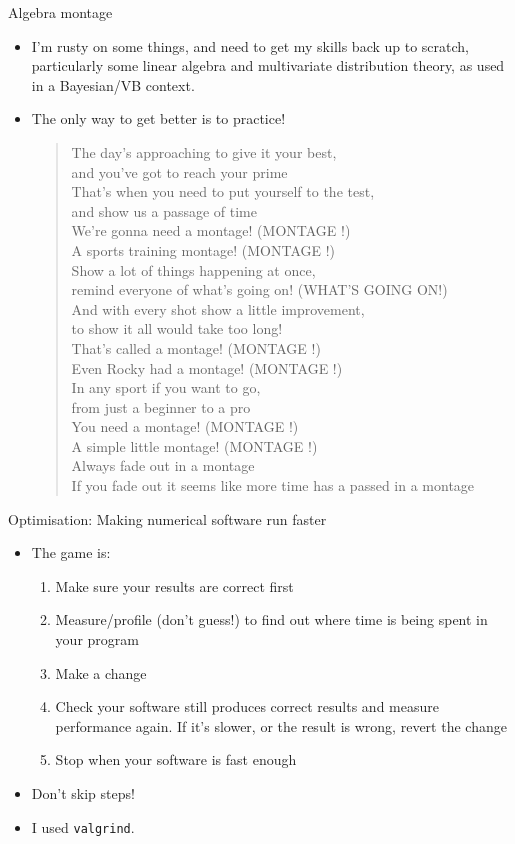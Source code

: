 \documentclass{beamer}
\begin{document}
\begin{frame}{Algebra montage}

\begin{itemize}
\item I'm rusty on some things, and need to get my skills back up to scratch, particularly some linear 
algebra and multivariate distribution theory, as used in a Bayesian/VB context.
\item The only way to get better is to practice!
\begin{quote}
\tiny
The day's approaching to give it your best, \\
and you've got to reach your prime \\
That's when you need to put yourself to the test, \\
and show us a passage of time \\
We're gonna need a montage! (MONTAGE !) \\
A sports training montage! (MONTAGE !) \\
Show a lot of things happening at once, \\
remind everyone of what's going on! (WHAT'S GOING ON!) \\
And with every shot show a little improvement, \\
to show it all would take too long! \\
That's called a montage! (MONTAGE !) \\
Even Rocky had a montage! (MONTAGE !) \\
In any sport if you want to go, \\
from just a beginner to a pro \\
You need a montage! (MONTAGE !) \\
A simple little montage! (MONTAGE !) \\
Always fade out in a montage \\
If you fade out it seems like more time has a passed in a montage
\end{quote}

\end{itemize}
\end{frame}

\begin{frame}{Optimisation: Making numerical software run faster}
\begin{itemize}
\item The game is: 
\begin{enumerate}
\item Make sure your results are correct first
\item Measure/profile (don't guess!) to find out where time is being spent in your program
\item Make a change
\item Check your software still produces correct results and measure performance again. If it's slower, or the result is wrong, revert the change
\item Stop when your software is fast enough
\end{enumerate}
\item Don't skip steps!
\item I used \texttt{valgrind}.
\end{itemize}
\end{frame}
\end{document}
